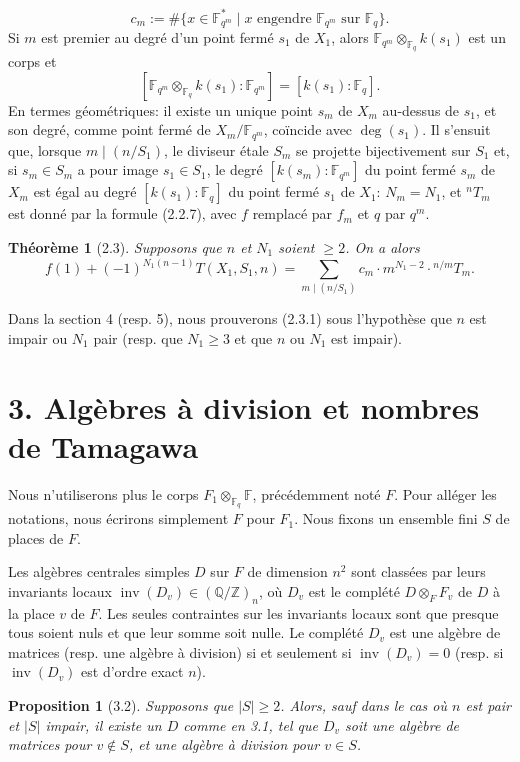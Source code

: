 \documentclass[10pt]{article}
\newcommand{\Fq}{\mathbb F_q}
\newcommand{\Fqm}{\mathbb F_{q^m}}
\newcommand{\Fb}{\mathbb F}
\newcommand{\Z}{\mathbb Z}
\newcommand{\Q}{\mathbb Q}
\newcommand{\degm}{\operatorname{deg}}
\newcommand{\inv}{\operatorname{inv}}
\theoremstyle{deligne}
\newtheorem*{theorem*}{Théorème}
\newtheorem*{proposition*}{Proposition}
\newcommand{\heading}[1]{\vspace{0.7em}\noindent{\bfseries #1}\quad}
\begin{document}
\begin{equation}\tag{2.2.9}
c_m:=\#\{x\in\Fqm^*\mid x\text{ engendre }\Fqm\text{ sur }\Fq\}.
\end{equation}
Si $m$ est premier au degré d'un point fermé $s_1$ de $X_1$, alors $\Fqm\otimes_{\Fq}k(s_1)$ est un corps et
\[
[\Fqm\otimes_{\Fq}k(s_1):\Fqm]=[k(s_1):\Fq].
\]
En termes géométriques: il existe un unique point $s_m$ de $X_m$ au-dessus de $s_1$, et son degré, comme point fermé de $X_m/\Fqm$, coïncide avec $\degm(s_1)$. Il s'ensuit que, lorsque $m\mid(n/S_1)$, le diviseur \'{e}tale $S_m$ se projette bijectivement sur $S_1$ et, si $s_m\in S_m$ a pour image $s_1\in S_1$, le degré $[k(s_m):\Fqm]$ du point fermé $s_m$ de $X_m$ est égal au degré $[k(s_1):\Fq]$ du point fermé $s_1$ de $X_1$: $N_m=N_1$, et ${}^nT_m$ est donné par la formule (2.2.7), avec $f$ remplacé par $f_m$ et $q$ par $q^m$.

\begin{theorem*}[2.3]
Supposons que $n$ et $N_1$ soient $\ge2$. On a alors
\begin{equation}\tag{2.3.1}
f(1)+(-1)^{N_1(n-1)}T(X_1,S_1,n)
=\sum_{m\mid(n/S_1)} c_m\cdot m^{N_1-2}\cdot{}^{n/m}T_m.
\end{equation}
\end{theorem*}
Dans la section 4 (resp. 5), nous prouverons (2.3.1) sous l'hypothèse que $n$ est impair ou $N_1$ pair (resp. que $N_1\ge3$ et que $n$ ou $N_1$ est impair).

\section*{3. Algèbres à division et nombres de Tamagawa}

Nous n'utiliserons plus le corps $F_1\otimes_{\Fq}\Fb$, précédemment noté $F$. Pour alléger les notations, nous écrirons simplement $F$ pour $F_1$. Nous fixons un ensemble fini $S$ de places de $F$.

\heading{3.1.} Les algèbres centrales simples $D$ sur $F$ de dimension $n^2$ sont classées par leurs invariants locaux $\inv(D_v)\in(\Q/\Z)_n$, où $D_v$ est le complété $D\otimes_FF_v$ de $D$ à la place $v$ de $F$. Les seules contraintes sur les invariants locaux sont que presque tous soient nuls et que leur somme soit nulle. Le complété $D_v$ est une algèbre de matrices (resp. une algèbre à division) si et seulement si $\inv(D_v)=0$ (resp. si $\inv(D_v)$ est d'ordre exact $n$).

\begin{proposition*}[3.2]
Supposons que $|S|\ge2$. Alors, sauf dans le cas où $n$ est pair et $|S|$ impair, il existe un $D$ comme en 3.1, tel que $D_v$ soit une algèbre de matrices pour $v\notin S$, et une algèbre à division pour $v\in S$.
\end{proposition*}
\end{document}
